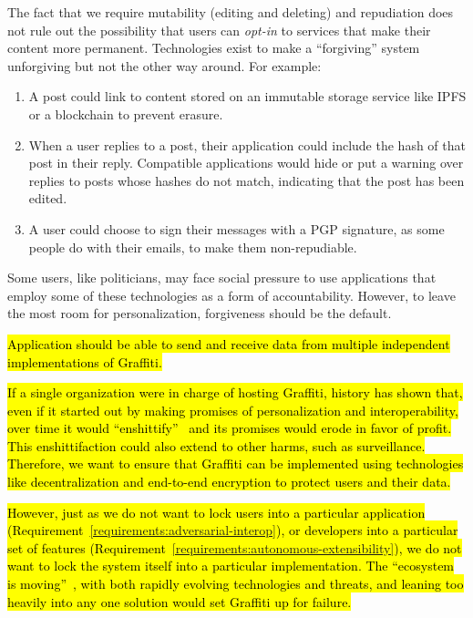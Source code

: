 The fact that we require mutability (editing and deleting) and repudiation does not rule
out the possibility that users can \emph{opt-in} to services that make their content more permanent.
Technologies exist to make a ``forgiving'' system unforgiving but not the other way around.
For example:
\begin{enumerate}
\item
A post could link to content stored on an immutable storage service like IPFS
or a blockchain to prevent erasure.
\item
When a user replies to a post, their application could include the hash
of that post in their reply. Compatible applications would
hide or put a warning over replies to posts whose hashes do not match,
indicating that the post has been edited.
\item
A user could choose to sign their messages with a PGP signature,
as some people do with their emails, to make them non-repudiable.
\end{enumerate}
Some users, like politicians, may face social pressure to use applications
that employ some of these technologies as a form of accountability.
However, to leave the most room for personalization, forgiveness should be the default.

\begin{requirement}
\label{requirements:parallel-implementations}
\hl{%
    Application should be able to send and receive data
    from multiple independent implementations of Graffiti.
}%
\end{requirement}

\hl{%
If a single organization were in charge of hosting Graffiti,
history has shown that, even if it started out by making promises of
personalization and interoperability,
over time it would ``enshittify''~{\cite{enshittification}}
and its promises would erode in favor of profit.
This enshittifaction could also extend to other harms,
such as surveillance.
Therefore, we want to ensure that Graffiti can be implemented using
technologies like decentralization and end-to-end encryption
to protect users and their data.
}%

\hl{%
However, just as we do not want to lock users into a particular application (Requirement~{\ref{requirements:adversarial-interop}}),
or developers into a particular set of features (Requirement~{\ref{requirements:autonomous-extensibility}}),
we do not want to lock the system itself into a particular implementation.
The ``ecosystem is moving''~{\cite{ecosystemmoving}}, with both rapidly evolving
technologies and threats, and
leaning too heavily into any one solution would set Graffiti up for failure.
}%

